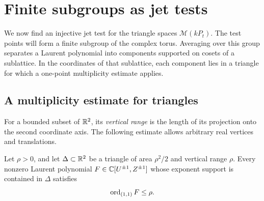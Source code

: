 \section{Finite subgroups as jet tests}\label{sec:lattice}

We now find an injective jet test for the triangle spaces
$\mathcal M(kP_t)$.  The test points will form a finite subgroup of the
complex torus.  Averaging over this group separates a Laurent polynomial
into components supported on cosets of a sublattice.  In the coordinates
of that sublattice, each component lies in a triangle for which a
one-point multiplicity estimate applies.

\subsection{A multiplicity estimate for triangles}

For a bounded subset of $\mathbb R^2$, its \emph{vertical range} is the length of
its projection onto the second coordinate axis.  The following estimate
allows arbitrary real vertices and translations.

\begin{lemma}\label{lem:triangle-multiplicity}
Let $\rho>0$, and let $\Delta\subset\mathbb R^2$ be a triangle of area
$\rho^2/2$ and vertical range $\rho$.  Every nonzero Laurent polynomial
$F\in\mathbb C[U^{\pm1},Z^{\pm1}]$ whose exponent support is contained in
$\Delta$ satisfies
\[
 \operatorname{ord}_{(1,1)}F\leq\rho.
\]
\end{lemma}



